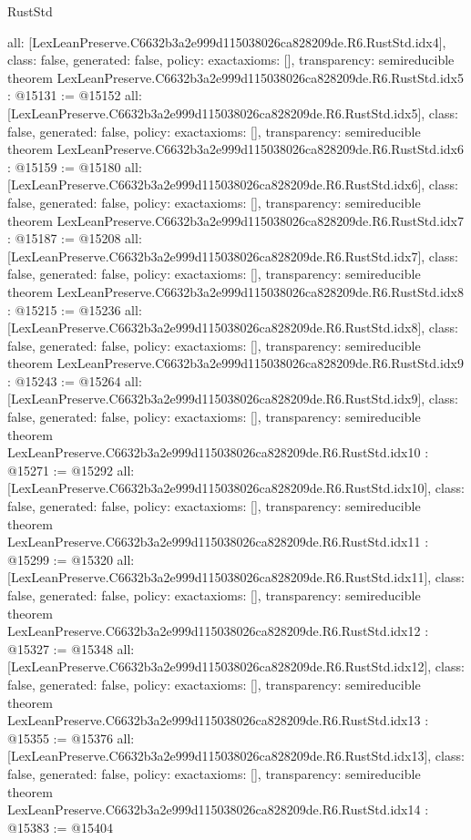 \begin{lexlean}{RustStd}
\begin{coremodule}
{  all: [LexLeanPreserve.C6632b3a2e999d115038026ca828209de.R6.RustStd.idx4],
  class: false,
  generated: false,
  policy: exact{axioms: []},
  transparency: semireducible
}
theorem LexLeanPreserve.C6632b3a2e999d115038026ca828209de.R6.RustStd.idx5 : @15131 := @15152 {
  all: [LexLeanPreserve.C6632b3a2e999d115038026ca828209de.R6.RustStd.idx5],
  class: false,
  generated: false,
  policy: exact{axioms: []},
  transparency: semireducible
}
theorem LexLeanPreserve.C6632b3a2e999d115038026ca828209de.R6.RustStd.idx6 : @15159 := @15180 {
  all: [LexLeanPreserve.C6632b3a2e999d115038026ca828209de.R6.RustStd.idx6],
  class: false,
  generated: false,
  policy: exact{axioms: []},
  transparency: semireducible
}
theorem LexLeanPreserve.C6632b3a2e999d115038026ca828209de.R6.RustStd.idx7 : @15187 := @15208 {
  all: [LexLeanPreserve.C6632b3a2e999d115038026ca828209de.R6.RustStd.idx7],
  class: false,
  generated: false,
  policy: exact{axioms: []},
  transparency: semireducible
}
theorem LexLeanPreserve.C6632b3a2e999d115038026ca828209de.R6.RustStd.idx8 : @15215 := @15236 {
  all: [LexLeanPreserve.C6632b3a2e999d115038026ca828209de.R6.RustStd.idx8],
  class: false,
  generated: false,
  policy: exact{axioms: []},
  transparency: semireducible
}
theorem LexLeanPreserve.C6632b3a2e999d115038026ca828209de.R6.RustStd.idx9 : @15243 := @15264 {
  all: [LexLeanPreserve.C6632b3a2e999d115038026ca828209de.R6.RustStd.idx9],
  class: false,
  generated: false,
  policy: exact{axioms: []},
  transparency: semireducible
}
theorem LexLeanPreserve.C6632b3a2e999d115038026ca828209de.R6.RustStd.idx10 : @15271 := @15292 {
  all: [LexLeanPreserve.C6632b3a2e999d115038026ca828209de.R6.RustStd.idx10],
  class: false,
  generated: false,
  policy: exact{axioms: []},
  transparency: semireducible
}
theorem LexLeanPreserve.C6632b3a2e999d115038026ca828209de.R6.RustStd.idx11 : @15299 := @15320 {
  all: [LexLeanPreserve.C6632b3a2e999d115038026ca828209de.R6.RustStd.idx11],
  class: false,
  generated: false,
  policy: exact{axioms: []},
  transparency: semireducible
}
theorem LexLeanPreserve.C6632b3a2e999d115038026ca828209de.R6.RustStd.idx12 : @15327 := @15348 {
  all: [LexLeanPreserve.C6632b3a2e999d115038026ca828209de.R6.RustStd.idx12],
  class: false,
  generated: false,
  policy: exact{axioms: []},
  transparency: semireducible
}
theorem LexLeanPreserve.C6632b3a2e999d115038026ca828209de.R6.RustStd.idx13 : @15355 := @15376 {
  all: [LexLeanPreserve.C6632b3a2e999d115038026ca828209de.R6.RustStd.idx13],
  class: false,
  generated: false,
  policy: exact{axioms: []},
  transparency: semireducible
}
theorem LexLeanPreserve.C6632b3a2e999d115038026ca828209de.R6.RustStd.idx14 : @15383 := @15404 {
}
\end{coremodule}
\end{lexlean}
